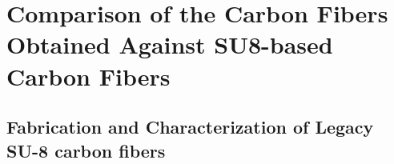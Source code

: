 
\chapter{Comparison of the Carbon Fibers Obtained Against SU8-based Carbon Fibers} %

\label{Chapter:7}

\section{Fabrication and Characterization of Legacy SU-8 carbon fibers}



